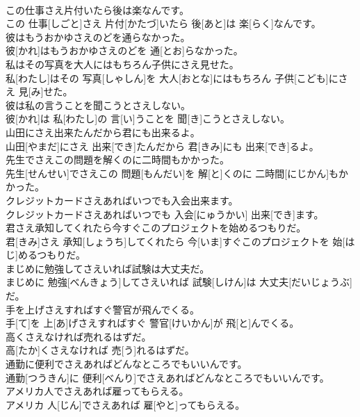 \documentclass[8pt]{extreport}
\begin{document}
\begin{CJK}{UTF8}{min}
\\	この仕事さえ片付いたら後は楽なんです。	
\\	この 仕事[しごと]さえ 片付[かたづ]いたら 後[あと]は 楽[らく]なんです。
\\	彼はもうおかゆさえのどを通らなかった。	
\\	彼[かれ]はもうおかゆさえのどを 通[とお]らなかった。
\\	私はその写真を大人にはもちろん子供にさえ見せた。	
\\	私[わたし]はその 写真[しゃしん]を 大人[おとな]にはもちろん 子供[こども]にさえ 見[み]せた。
\\	彼は私の言うことを聞こうとさえしない。	
\\	彼[かれ]は 私[わたし]の 言[い]うことを 聞[き]こうとさえしない。
\\	山田にさえ出来たんだから君にも出来るよ。	
\\	山田[やまだ]にさえ 出来[でき]たんだから 君[きみ]にも 出来[でき]るよ。
\\	先生でさえこの問題を解くのに二時間もかかった。	
\\	先生[せんせい]でさえこの 問題[もんだい]を 解[と]くのに 二時間[にじかん]もかかった。
\\	クレジットカードさえあればいつでも入会出来ます。	
\\	クレジットカードさえあればいつでも 入会[にゅうかい] 出来[でき]ます。
\\	君さえ承知してくれたら今すぐこのプロジェクトを始めるつもりだ。	
\\	君[きみ]さえ 承知[しょうち]してくれたら 今[いま]すぐこのプロジェクトを 始[はじ]めるつもりだ。
\\	まじめに勉強してさえいれば試験は大丈夫だ。	
\\	まじめに 勉強[べんきょう]してさえいれば 試験[しけん]は 大丈夫[だいじょうぶ]だ。
\\	手を上げさえすればすぐ警官が飛んでくる。	
\\	手[て]を 上[あ]げさえすればすぐ 警官[けいかん]が 飛[と]んでくる。
\\	高くさえなければ売れるはずだ。	
\\	高[たか]くさえなければ 売[う]れるはずだ。
\\	通勤に便利でさえあればどんなところでもいいんです。	
\\	通勤[つうきん]に 便利[べんり]でさえあればどんなところでもいいんです。
\\	アメリカ人でさえあれば雇ってもらえる。	
\\	アメリカ 人[じん]でさえあれば 雇[やと]ってもらえる。

\end{CJK}
\end{document}
